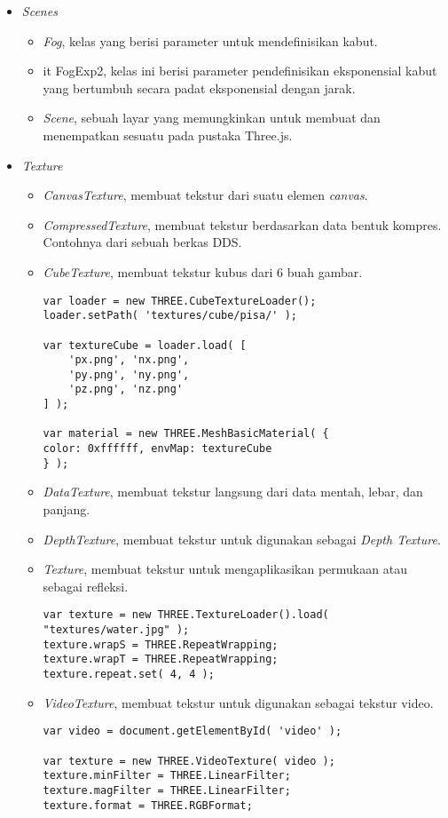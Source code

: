 \begin{itemize}
\item \textit{Scenes}

	\begin{itemize}
	\item {\it Fog}, kelas yang berisi parameter untuk mendefinisikan kabut.
	
	\item {it FogExp2}, kelas ini berisi parameter pendefinisikan eksponensial kabut yang bertumbuh secara padat eksponensial dengan jarak.
	
	\item {\it Scene}, sebuah layar yang memungkinkan untuk membuat dan menempatkan sesuatu pada pustaka Three.js. 
	\end{itemize}
	
\item \textit{Texture}
	\begin{itemize}
	\item{\it CanvasTexture}, membuat tekstur dari suatu elemen {\it canvas}.
	\item{\it CompressedTexture}, membuat tekstur berdasarkan data bentuk kompres. Contohnya dari sebuah berkas DDS.
	\item{\it CubeTexture}, membuat tekstur kubus dari 6 buah gambar.
	
\begin{lstlisting}
var loader = new THREE.CubeTextureLoader();
loader.setPath( 'textures/cube/pisa/' );

var textureCube = loader.load( [
	'px.png', 'nx.png',
	'py.png', 'ny.png',
	'pz.png', 'nz.png'
] );

var material = new THREE.MeshBasicMaterial( { 
color: 0xffffff, envMap: textureCube 
} );
\end{lstlisting}
	
	\item{\it DataTexture}, membuat tekstur langsung dari data mentah, lebar, dan panjang.
	\item{\it DepthTexture}, membuat tekstur untuk digunakan sebagai {\it Depth Texture}.
	\item {\it Texture}, membuat tekstur untuk mengaplikasikan permukaan atau sebagai refleksi.
	
\begin{lstlisting}
var texture = new THREE.TextureLoader().load( "textures/water.jpg" );
texture.wrapS = THREE.RepeatWrapping;
texture.wrapT = THREE.RepeatWrapping;
texture.repeat.set( 4, 4 );
\end{lstlisting}
	
	\item{\it VideoTexture}, membuat tekstur untuk digunakan sebagai tekstur video.
	
\begin{lstlisting}
var video = document.getElementById( 'video' );

var texture = new THREE.VideoTexture( video );
texture.minFilter = THREE.LinearFilter;
texture.magFilter = THREE.LinearFilter;
texture.format = THREE.RGBFormat;
\end{lstlisting}
	
	\end{itemize}	
	
\end{itemize}
 
